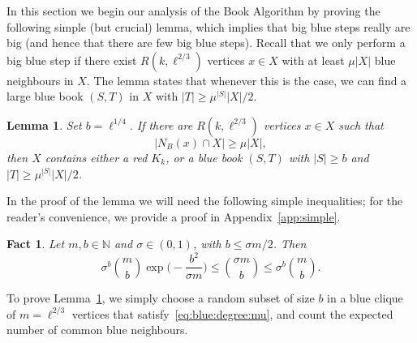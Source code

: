 \documentclass[12pt,reqno]{amsart}
\newtheorem{lemma}[theorem]{Lemma}
\newtheorem{fact}[theorem]{Fact}
\theoremstyle{definition}
\theoremstyle{remark}
\newcommand\N{\mathbb{N}}
\renewcommand{\le}{\leqslant}
\renewcommand{\ge}{\geqslant}
\def\N{\mathbb{N}}
\begin{document}
In this section we begin our analysis of the Book Algorithm by proving the following simple (but crucial) lemma, which implies that big blue steps really are big (and hence that there are few big blue steps). Recall that we only perform a big blue step if there exist $R(k,\ell^{2/3})$ vertices $x \in X$ with at least $\mu |X|$ blue neighbours in $X$. The lemma states that whenever this is the case, we can find a large blue book $(S,T)$ in $X$ with %
$|T| \ge \mu^{|S|} |X|/2$.


\begin{lemma}\label{lem:big:blue:step}
Set $b = \ell^{1/4}$. If there are $R(k,\ell^{2/3})$ vertices $x \in X$ such that
\begin{equation}\label{eq:blue:degree:mu}
|N_B(x) \cap X| \ge \mu |X|,
\end{equation}
then $X$ contains either a red $K_k$, or a blue book $(S,T)$ with $|S| \ge b$ and $|T| \ge \mu^{|S|} |X|/2$.  
\end{lemma}

In the proof of the lemma we will need the following simple inequalities; for the reader's convenience, we provide a proof in Appendix~\ref{app:simple}.

\begin{fact}\label{binomial:fact1}
Let $m,b \in \N$ and $\sigma \in (0,1)$, with $b \le \sigma m / 2$. Then
$$ \sigma^b {m \choose b} \exp\bigg( - \frac{b^2}{\sigma m} \bigg) \le {\sigma m \choose b} \le \sigma^b {m \choose b}  .$$ 
\end{fact}

To prove Lemma~\ref{lem:big:blue:step}, we simply choose a random subset of size $b$ in a blue clique of $m = \ell^{2/3}$ vertices that satisfy~\eqref{eq:blue:degree:mu}, and count the expected number of common blue neighbours. 
\end{document}
